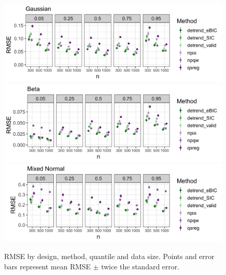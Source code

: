 \documentclass[12pt]{article}
\begin{document}
	\begin{figure}
		\includegraphics[width=\linewidth]{Figures/gaus_mse.png}	
		\includegraphics[width=\linewidth]{Figures/shapebeta_mse.png}
		\includegraphics[width=\linewidth]{Figures/mixednorm_mse.png}
		\caption{RMSE by design, method, quantile and data size. Points and error bars represent mean RMSE $\pm$ twice the standard error.}		
		\label{fig:quantile_mse}
	\end{figure}
\end{document}
